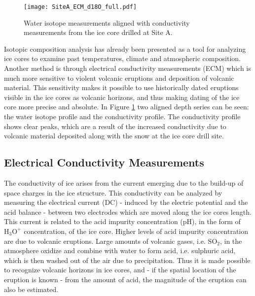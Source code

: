 \documentclass[../../CompleteThesis2/Complete_2ndDraft]{subfiles}
\begin{document}
\begin{figure}[h]
	\centering
	\texttt{[image: SiteA\_ECM\_d18O\_full.pdf]}
	\caption[Conductivity and $\delta^{18}$O measurements from Site A]{\small Water isotope measurements aligned with conductivity measurements from the ice core drilled at Site A.}
	\label{Fig:ICE_SiteA_ECM_d18O_full}
\end{figure}

Isotopic composition analysis has already been presented as a tool for analyzing ice cores to examine past temperatures, climate and atmospheric composition. Another method is through electrical conductivity measurements (ECM) \cite[C. Hammer, 1980]{Hammer1980} which is much more sensitive to violent volcanic eruptions and deposition of volcanic material. This sensitivity makes it possible to use historically dated eruptions visible in the ice cores as volcanic horizons, and thus making dating of the ice core more precise and absolute. In Figure \ref{Fig:ICE_SiteA_ECM_d18O_full} two aligned depth series can be seen: the water isotope profile and the conductivity profile. The conductivity profile shows clear peaks, which are a result of the increased conductivity due to volcanic material deposited along with the snow at the ice core drill site.


\subsection[ECM][ECM]{Electrical Conductivity Measurements}
\label{Sec:Ice_ECMandDEP_ECM}


The conductivity of ice arises from the current emerging due to the build-up of space charges in the ice structure. This conductivity can be analyzed by measuring the electrical current (DC) - induced by the electric potential and the acid balance - between two electrodes which are moved along the ice cores length. This current is related to the acid impurity concentration (pH), in the form of $\text{H}_3\text{O}^+$ concentration, of the ice core. Higher levels of acid impurity concentration are due to volcanic eruptions. Large amounts of volcanic gases, i.e. $\text{SO}_2$, in the atmosphere oxidize and combine with water to form acid, i.e. sulphuric acid, which is then washed out of the air due to precipitation. Thus it is made possible to recognize volcanic horizons in ice cores, and - if the spatial location of the eruption is known - from the amount of acid, the magnitude of the eruption can also be estimated.
\end{document}
